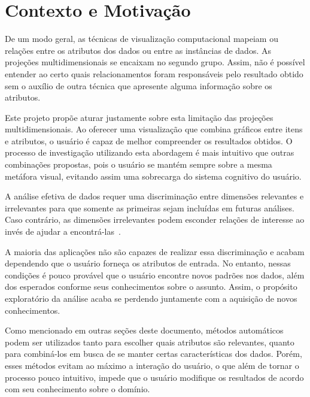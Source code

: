 
\section{Contexto e Motivação}

De um modo geral, as técnicas de visualização computacional mapeiam ou relações entre os atributos dos dados ou entre as instâncias de dados. As projeções multidimensionais se encaixam no segundo grupo. Assim, não é possível entender ao certo quais relacionamentos foram responsáveis pelo resultado obtido sem o auxílio de outra técnica que apresente alguma informação sobre os atributos.

Este projeto propõe aturar justamente sobre esta limitação das projeções multidimensionais. Ao oferecer uma visualização que combina gráficos entre itens e atributos, o usuário é capaz de melhor compreender os resultados obtidos. O processo de investigação utilizando esta abordagem é mais intuitivo que outras combinações propostas, pois o usuário se mantém sempre sobre a mesma metáfora visual, evitando assim uma sobrecarga do sistema cognitivo do usuário.

A análise efetiva de dados requer uma discriminação entre dimensões relevantes e irrelevantes para que somente as primeiras sejam incluídas em futuras análises. Caso contrário, as dimensões irrelevantes podem esconder relações de interesse ao invés de ajudar a encontrá-las~\cite{Guo2003}. 

A maioria das aplicações não são capazes de realizar essa discriminação e acabam dependendo que o usuário forneça os atributos de entrada. No entanto, nessas condições é pouco provável que o usuário encontre novos padrões nos dados, além dos esperados conforme seus conhecimentos sobre o assunto. Assim, o propósito exploratório da análise acaba se perdendo juntamente com a aquisição de novos conhecimentos.    

Como mencionado em outras seções deste documento, métodos automáticos podem ser utilizados tanto para escolher quais atributos são relevantes, quanto para combiná-los em busca de se manter certas características dos dados. Porém, esses métodos evitam ao máximo a interação do usuário, o que além de tornar o processo pouco intuitivo, impede que o usuário modifique os resultados de acordo com seu conhecimento sobre o domínio.

